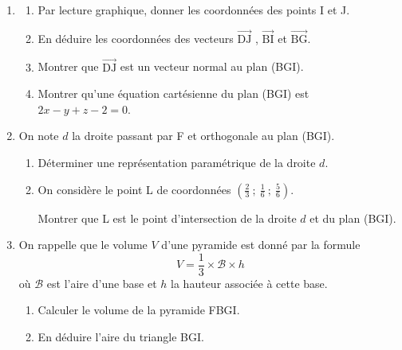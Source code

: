 \documentclass[10pt]{article}
\providecommand{\vv}[1]{\overrightarrow{#1}}
\providecommand{\vv}[1]{{\overrightarrow{#1}}}
\begin{document}
\begin{enumerate}
\item 
	\begin{enumerate}
		\item Par lecture graphique, donner les coordonnées des points I et J.
		\item En déduire les coordonnées des vecteurs $\vv{\text{DJ}}$ , $\vv{\text{BI}}$ et $\vv{\text{BG}}$.
		\item Montrer que $\vv{\text{DJ}}$ est un vecteur normal au plan (BGI).
		\item Montrer qu’une équation cartésienne du plan (BGI) est $2x - y + z - 2 = 0$.
	\end{enumerate}
\item On note $d$ la droite passant par F et orthogonale au plan (BGI).
	\begin{enumerate}
		\item Déterminer une représentation paramétrique de la droite $d$.
		\item On considère le point L de coordonnées $\left(\frac{2}{3}~;~\frac{1}{6}~;~\frac{5}{6}\right)$.

Montrer que L est le point d’intersection de la droite $d$ et du plan (BGI).
	\end{enumerate}
\item On rappelle que le volume $V$ d'une pyramide est donné par la formule
\[V=\dfrac{1}{3}\times \mathcal{B}\times h\]
où $\mathcal{B}$ est l'aire d’une base et $h$ la hauteur associée à cette base.
\begin{enumerate}
\item Calculer le volume de la pyramide FBGI.
\item En déduire l'aire du triangle BGI.
\end{enumerate}
\end{enumerate}

\bigskip
\end{document}
